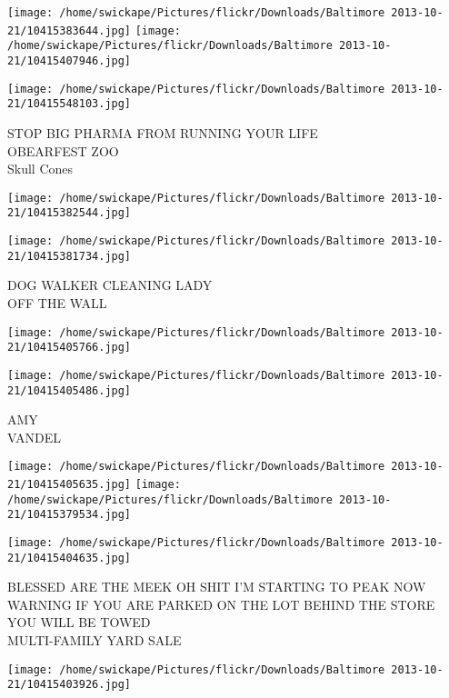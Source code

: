 \documentclass[10pt,letterpaper]{article}
\begin{document}
\texttt{[image: /home/swickape/Pictures/flickr/Downloads/Baltimore 2013-10-21/10415383644.jpg]}
\texttt{[image: /home/swickape/Pictures/flickr/Downloads/Baltimore 2013-10-21/10415407946.jpg]}

\texttt{[image: /home/swickape/Pictures/flickr/Downloads/Baltimore 2013-10-21/10415548103.jpg]}

STOP BIG PHARMA FROM RUNNING YOUR LIFE\\
OBEARFEST ZOO\\
Skull Cones\\
\pagebreak

\texttt{[image: /home/swickape/Pictures/flickr/Downloads/Baltimore 2013-10-21/10415382544.jpg]}

\vspace{0.25in}
\texttt{[image: /home/swickape/Pictures/flickr/Downloads/Baltimore 2013-10-21/10415381734.jpg]}

DOG WALKER CLEANING LADY\\
OFF THE WALL\\
\pagebreak

\texttt{[image: /home/swickape/Pictures/flickr/Downloads/Baltimore 2013-10-21/10415405766.jpg]}

\vspace{0.25in}
\texttt{[image: /home/swickape/Pictures/flickr/Downloads/Baltimore 2013-10-21/10415405486.jpg]}

AMY\\
VANDEL\\
\pagebreak

\texttt{[image: /home/swickape/Pictures/flickr/Downloads/Baltimore 2013-10-21/10415405635.jpg]}
\texttt{[image: /home/swickape/Pictures/flickr/Downloads/Baltimore 2013-10-21/10415379534.jpg]}

\texttt{[image: /home/swickape/Pictures/flickr/Downloads/Baltimore 2013-10-21/10415404635.jpg]}

BLESSED ARE THE MEEK OH SHIT I'M STARTING TO PEAK NOW\\
WARNING IF YOU ARE PARKED ON THE LOT BEHIND THE STORE YOU WILL BE TOWED\\
MULTI{-}FAMILY YARD SALE\\
\pagebreak

\texttt{[image: /home/swickape/Pictures/flickr/Downloads/Baltimore 2013-10-21/10415403926.jpg]}
\end{document}
